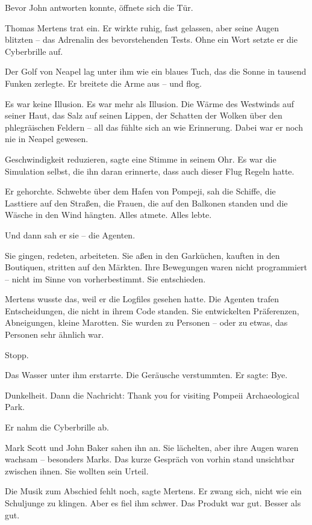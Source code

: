\documentclass[
]{article}
\begin{document}
Bevor John antworten konnte, öffnete sich die Tür.

Thomas Mertens trat ein. Er wirkte ruhig, fast gelassen, aber seine Augen blitzten -- das Adrenalin des bevorstehenden Tests. Ohne ein Wort setzte er die Cyberbrille auf.

Der Golf von Neapel lag unter ihm wie ein blaues Tuch, das die Sonne in tausend Funken zerlegte. Er breitete die Arme aus -- und flog.

Es war keine Illusion. Es war mehr als Illusion. Die Wärme des Westwinds auf seiner Haut, das Salz auf seinen Lippen, der Schatten der Wolken über den phlegräischen Feldern -- all das fühlte sich an wie Erinnerung. Dabei war er noch nie in Neapel gewesen.

\glqq Geschwindigkeit reduzieren\grqq, sagte eine Stimme in seinem Ohr. Es war die Simulation selbst, die ihn daran erinnerte, dass auch dieser Flug Regeln hatte.

Er gehorchte. Schwebte über dem Hafen von Pompeji, sah die Schiffe, die Lasttiere auf den Straßen, die Frauen, die auf den Balkonen standen und die Wäsche in den Wind hängten. Alles atmete. Alles lebte.

Und dann sah er sie -- die Agenten.

Sie gingen, redeten, arbeiteten. Sie aßen in den Garküchen, kauften in den Boutiquen, stritten auf den Märkten. Ihre Bewegungen waren nicht programmiert -- nicht im Sinne von vorherbestimmt. Sie entschieden.

Mertens wusste das, weil er die Logfiles gesehen hatte. Die Agenten trafen Entscheidungen, die nicht in ihrem Code standen. Sie entwickelten Präferenzen, Abneigungen, kleine Marotten. Sie wurden zu Personen -- oder zu etwas, das Personen sehr ähnlich war.

\glqq Stopp.\grqq

Das Wasser unter ihm erstarrte. Die Geräusche verstummten. Er sagte: \glqq Bye.\grqq

Dunkelheit. Dann die Nachricht: \glqq Thank you for visiting Pompeii Archaeological Park.\grqq

Er nahm die Cyberbrille ab.

Mark Scott und John Baker sahen ihn an. Sie lächelten, aber ihre Augen waren wachsam -- besonders Marks. Das kurze Gespräch von vorhin stand unsichtbar zwischen ihnen. Sie wollten sein Urteil.

\glqq Die Musik zum Abschied fehlt noch\grqq, sagte Mertens. Er zwang sich, nicht wie ein Schuljunge zu klingen. Aber es fiel ihm schwer. Das Produkt war gut. Besser als gut.
\end{document}
